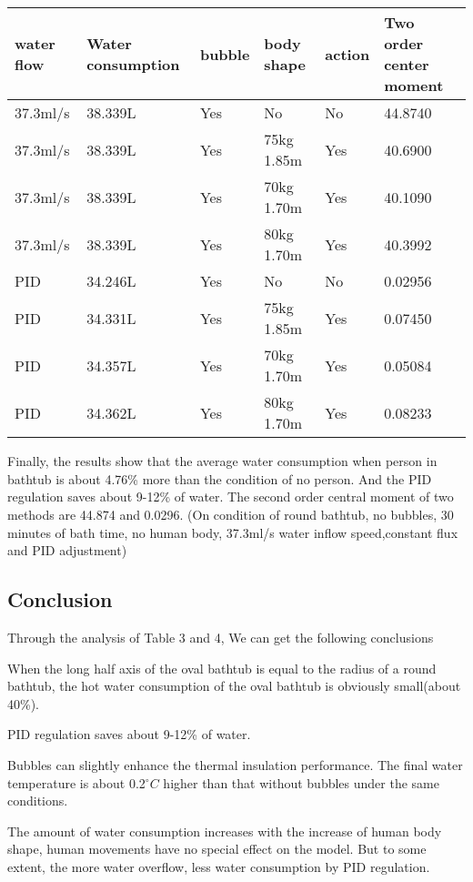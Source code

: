 \documentclass{mcmthesis}
\begin{document}
\begin{table}[H]
	\setlength{\abovecaptionskip}{0pt}
	\setlength{\belowcaptionskip}{0pt}
	\\
	\\
	\begin{tabular}{p{2cm}|p{2cm}|p{1.5cm}|p{3cm}|p{1cm}|p{3cm}}
		\hline
		\rowcolor[gray]{0.9}\bf{water flow}	&\bf{Water consumption} &\bf{bubble}&\bf{body shape}&\bf{action}&\bf{Two order center moment} \\
		\hline
		37.3ml/s & 38.339L &Yes &No 		&No  &44.8740\\
		37.3ml/s & 38.339L &Yes &75kg 1.85m &Yes &40.6900\\	
		37.3ml/s & 38.339L &Yes &70kg 1.70m &Yes &40.1090\\
		37.3ml/s & 38.339L &Yes &80kg 1.70m &Yes &40.3992\\
		\hline
		PID & 34.246L &Yes &No &No &0.02956\\
		PID & 34.331L &Yes &75kg 1.85m &Yes &0.07450\\	
		PID & 34.357L &Yes &70kg 1.70m &Yes &0.05084\\
		PID & 34.362L &Yes &80kg 1.70m &Yes &0.08233\\
		\hline
	\end{tabular}
\end{table}
\indent Finally, the results show that the average water consumption when person in bathtub is about 4.76\% more than the condition of no person. And the PID regulation saves about 9-12\% of water. The second order central moment of two methods are 44.874 and 0.0296. (On condition of round bathtub, no bubbles, 30 minutes of bath time, no human body, 37.3ml/s water inflow speed,constant flux and PID adjustment)\\
\subsection{Conclusion}
Through the analysis of Table 3 and 4, We can get the following conclusions
\begin{itemize}
\item{When the long half axis of the oval bathtub is equal to the radius of a round bathtub, the hot water consumption of the oval bathtub is obviously small(about 40\%).
\item{PID regulation saves about 9-12\% of water.}
\item{Bubbles can slightly enhance the thermal insulation performance. The final water temperature is about 0.2${^\circ}C$ higher than that without bubbles under the same conditions.
}
\item{The amount of water consumption increases with the increase of human body shape, human movements have no special effect on the model. But to some extent, the more water overflow, less water consumption by PID regulation.
}}
\end{itemize}	
\end{document}
